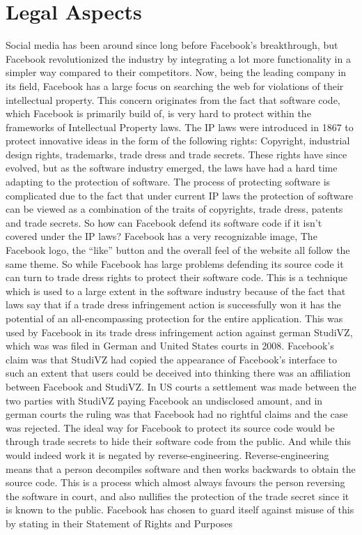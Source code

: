 \documentclass[conference]{IEEEtran}
\begin{document}
\section{Legal Aspects}
\label{legal}
Social media has been around since long before Facebook’s breakthrough, but Facebook revolutionized the industry by integrating a lot more functionality in a simpler way compared to their competitors. Now, being the leading company in its field, Facebook has a large focus on searching the web for violations of their intellectual property\cite{nguyen2012}. This concern originates from the fact that software code, which Facebook is primarily build of, is very hard to protect within the frameworks of Intellectual Property laws. The IP laws were introduced in 1867\cite{wikiIntellect} to protect innovative ideas in the form of the following rights: Copyright, industrial design rights, trademarks, trade dress and trade secrets. These rights have since evolved, but as the software industry emerged, the laws have had a hard time adapting to the protection of software. The process of protecting software is complicated due to the fact that under current IP laws the protection of software can be viewed as a combination of the traits of copyrights, trade dress, patents and trade secrets\cite{nguyen2012}.
So how can Facebook defend its software code if it isn’t covered under the IP laws? Facebook has a very recognizable image, The Facebook logo, the “like” button and the overall feel of the website all follow the same theme. So while Facebook has large problems defending its source code it can turn to trade dress rights to protect their software code. This is a technique which is used to a large extent in the software industry because of the fact that laws say that if a trade dress infringement action is successfully won it has the potential of an all-encompassing protection for the entire application\cite{king2000}. This was used by Facebook in its trade dress infringement action against german StudiVZ\cite{nguyen2012}, which was was filed in German and United States courts in 2008\cite{facevsstudi}. Facebook’s claim was that StudiVZ had copied the appearance of Facebook’s interface to such an extent that users could be deceived into thinking there was an affiliation between Facebook and StudiVZ. In US courts a settlement was made between the two parties with StudiVZ paying Facebook an undisclosed amount, and in german courts the ruling was that Facebook had no rightful claims and the case was rejected.
The ideal way for Facebook to protect its source code would be through trade secrets to hide their software code from the public. And while this would indeed work it is negated by reverse-engineering. Reverse-engineering means that a person decompiles software and then works backwards to obtain the source code\cite{nguyen2012}. This is a process which almost always favours the person reversing the software in court\cite{reverse}, and also nullifies the protection of the trade secret since it is known to the public\cite{nguyen2012}. Facebook has chosen to guard itself against misuse of this by stating in their Statement of Rights and Purposes
\end{document}
